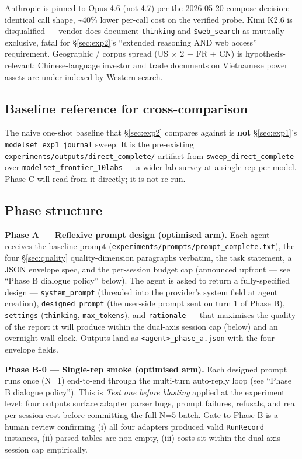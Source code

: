 \documentclass[a4paper,11pt]{article}
\begin{document}
Anthropic is pinned to Opus 4.6 (not 4.7) per the 2026-05-20 compose
decision: identical call shape, \textasciitilde40\% lower per-call cost
on the verified probe. Kimi K2.6 is disqualified --- vendor docs
document \texttt{thinking} and \texttt{\$web\_search} as mutually
exclusive, fatal for §\ref{sec:exp2}'s ``extended reasoning AND web
access'' requirement. Geographic / corpus spread (US × 2 + FR + CN) is
hypothesis-relevant: Chinese-language investor and trade documents on
Vietnamese power assets are under-indexed by Western search.

\subsection*{Baseline reference for
cross-comparison}

The naive one-shot baseline that §\ref{sec:exp2} compares against is
\textbf{not} §\ref{sec:exp1}'s \texttt{modelset\_exp1\_journal} sweep.
It is the pre-existing \texttt{experiments/outputs/direct\_complete/}
artifact from \texttt{sweep\_direct\_complete} over
\texttt{modelset\_frontier\_10labs} --- a wider lab survey at a single
rep per model. Phase C will read from it directly; it is not re-run.

\subsection*{Phase structure}

\textbf{Phase A --- Reflexive prompt design (optimised arm).} Each agent
receives the baseline prompt
(\texttt{experiments/prompts/prompt\_complete.txt}), the four
§\ref{sec:quality} quality-dimension paragraphs verbatim, the task
statement, a JSON envelope spec, and the per-session budget cap
(announced upfront --- see ``Phase B dialogue policy'' below). The agent
is asked to return a fully-specified design --- \texttt{system\_prompt}
(threaded into the provider's system field at agent creation),
\texttt{designed\_prompt} (the user-side prompt sent on turn 1 of Phase
B), \texttt{settings} (\texttt{thinking}, \texttt{max\_tokens}), and
\texttt{rationale} --- that maximises the quality of the report it will
produce within the dual-axis session cap (below) and an overnight
wall-clock. Outputs land as
\texttt{\textless{}agent\textgreater{}\_phase\_a.json} with the four
envelope fields.

\textbf{Phase B-0 --- Single-rep smoke (optimised arm).} Each designed
prompt runs once (N=1) end-to-end through the multi-turn auto-reply loop
(see ``Phase B dialogue policy''). This is \emph{Test one before
blasting} applied at the experiment level: four outputs surface adapter
parser bugs, prompt failures, refusals, and real per-session cost before
committing the full N=5 batch. Gate to Phase B is a human review
confirming (i) all four adapters produced valid \texttt{RunRecord}
instances, (ii) parsed tables are non-empty, (iii) costs sit within the
dual-axis session cap empirically.
\end{document}
